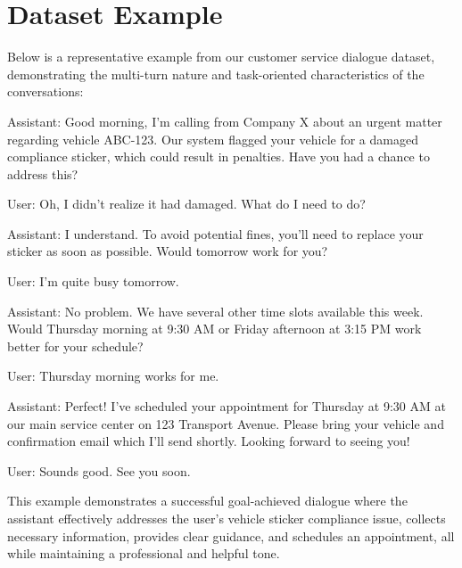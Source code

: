 \documentclass[
]{style/ceurart}
\begin{document}
\section{Dataset Example}
\label{app:dataset_example}
Below is a representative example from our customer service dialogue dataset, demonstrating the multi-turn nature and task-oriented characteristics of the conversations:

\begin{tcolorbox}[colback=gray!5, colframe=gray!50]
\fontsize{8pt}{11pt}\selectfont %
Assistant: Good morning, I'm calling from Company X about an urgent matter regarding vehicle ABC-123. Our system flagged your vehicle for a damaged compliance sticker, which could result in penalties. Have you had a chance to address this?

User: Oh, I didn't realize it had damaged. What do I need to do?

Assistant: I understand. To avoid potential fines, you'll need to replace your sticker as soon as possible. Would tomorrow work for you?

User: I'm quite busy tomorrow.

Assistant: No problem. We have several other time slots available this week. Would Thursday morning at 9:30 AM or Friday afternoon at 3:15 PM work better for your schedule?

User: Thursday morning works for me.

Assistant: Perfect! I've scheduled your appointment for Thursday at 9:30 AM at our main service center on 123 Transport Avenue. Please bring your vehicle and confirmation email which I'll send shortly. Looking forward to seeing you!

User: Sounds good. See you soon.
\end{tcolorbox}

This example demonstrates a successful goal-achieved dialogue where the assistant effectively addresses the user's vehicle sticker compliance issue, collects necessary information, provides clear guidance, and schedules an appointment, all while maintaining a professional and helpful tone.
\end{document}
